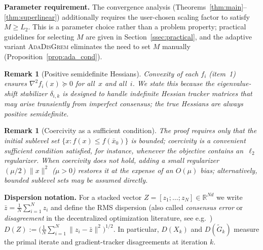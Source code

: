 \documentclass[11pt,a4paper]{article}
\def\cO{O}%
\newtheorem{remark}[theorem]{Remark}
\newcommand{\R}{\mathbb{R}}
\newcommand{\cO}{\mathcal{O}}
\begin{document}
	\noindent\textbf{Parameter requirement.}
	The convergence analysis (Theorems~\ref{thm:main}--\ref{thm:superlinear})
	additionally requires the user-chosen scaling factor to satisfy
	$M\ge L_2$.
	This is a parameter choice rather than a problem property; practical
	guidelines for selecting $M$ are given in Section~\ref{ssec:practical},
	and the adaptive variant \textsc{AdaDisGrem} eliminates the need to
	set $M$ manually (Proposition~\ref{prop:ada_cond}).
	
	\begin{remark}[Positive semidefinite Hessians]
	Convexity of each $f_i$ (item~1) ensures
	$\nabla^2 f_i(x)\succeq 0$ for all~$x$ and all~$i$.
	We state this because the eigenvalue-shift stabilizer
	$\delta_{i,k}$ is designed to handle indefinite Hessian
	\emph{tracker} matrices that may arise transiently from
	imperfect consensus; the true Hessians are always positive
	semidefinite.
	\end{remark}
	
	\begin{remark}[Coercivity as a sufficient condition]
	The proof requires only that the initial sublevel set
	$\{x : f(x) \le f(\bar x_0)\}$ is bounded;
	coercivity is a convenient sufficient condition satisfied,
	for instance, whenever the objective contains an~$\ell_2$
	regularizer.
	When coercivity does not hold, adding a small regularizer
	$(\mu/2)\|x\|^2$ ($\mu>0$) restores it at the expense of an
	$\cO(\mu)$ bias; alternatively, bounded sublevel sets may be
	assumed directly.
	\end{remark}
	

	\noindent\textbf{Dispersion notation.}
	For a stacked vector $Z=[z_1;\dots;z_N]\in\R^{Nd}$
	we write $\bar z=\frac1N\sum_{i=1}^N z_i$ and define the RMS dispersion
	(also called \emph{consensus error} or \emph{disagreement} in the
	decentralized optimization literature, see e.g.\
	\citet{nedic2009subgradient,nedic2017diging})
	\(
	  D(Z):=\bigl(\tfrac1N\sum_{i=1}^N\|z_i-\bar z\|^2\bigr)^{1/2}.
	\)
	In particular, $D(X_k)$ and $D(\tilde G_k)$ measure the primal
	iterate and gradient-tracker disagreements at iteration $k$.
\end{document}

